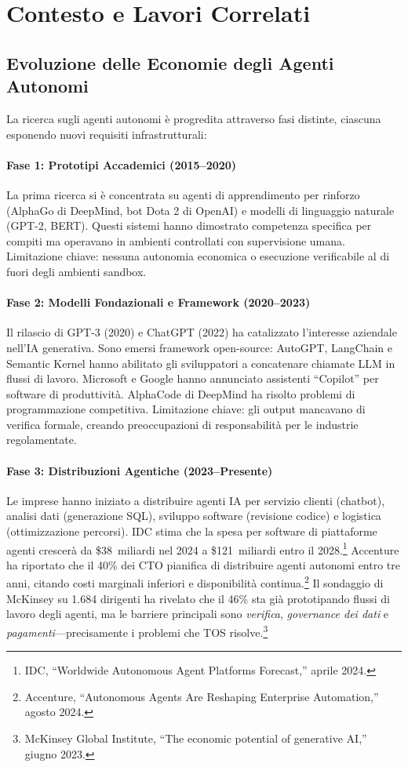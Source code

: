 \documentclass[11pt]{article}
\begin{document}
\section{Contesto e Lavori Correlati}
\subsection{Evoluzione delle Economie degli Agenti Autonomi}
La ricerca sugli agenti autonomi è progredita attraverso fasi distinte, ciascuna esponendo nuovi requisiti infrastrutturali:

\paragraph{Fase 1: Prototipi Accademici (2015--2020)} La prima ricerca si è concentrata su agenti di apprendimento per rinforzo (AlphaGo di DeepMind, bot Dota 2 di OpenAI) e modelli di linguaggio naturale (GPT-2, BERT). Questi sistemi hanno dimostrato competenza specifica per compiti ma operavano in ambienti controllati con supervisione umana. Limitazione chiave: nessuna autonomia economica o esecuzione verificabile al di fuori degli ambienti sandbox.

\paragraph{Fase 2: Modelli Fondazionali e Framework (2020--2023)} Il rilascio di GPT-3 (2020) e ChatGPT (2022) ha catalizzato l'interesse aziendale nell'IA generativa. Sono emersi framework open-source: AutoGPT, LangChain e Semantic Kernel hanno abilitato gli sviluppatori a concatenare chiamate LLM in flussi di lavoro. Microsoft e Google hanno annunciato assistenti ``Copilot'' per software di produttività. AlphaCode di DeepMind ha risolto problemi di programmazione competitiva. Limitazione chiave: gli output mancavano di verifica formale, creando preoccupazioni di responsabilità per le industrie regolamentate.

\paragraph{Fase 3: Distribuzioni Agentiche (2023--Presente)} Le imprese hanno iniziato a distribuire agenti IA per servizio clienti (chatbot), analisi dati (generazione SQL), sviluppo software (revisione codice) e logistica (ottimizzazione percorsi). IDC stima che la spesa per software di piattaforme agenti crescerà da \$38~miliardi nel 2024 a \$121~miliardi entro il 2028.\footnote{IDC, ``Worldwide Autonomous Agent Platforms Forecast,'' aprile 2024.} Accenture ha riportato che il 40\% dei CTO pianifica di distribuire agenti autonomi entro tre anni, citando costi marginali inferiori e disponibilità continua.\footnote{Accenture, ``Autonomous Agents Are Reshaping Enterprise Automation,'' agosto 2024.} Il sondaggio di McKinsey su 1.684 dirigenti ha rivelato che il 46\% sta già prototipando flussi di lavoro degli agenti, ma le barriere principali sono \emph{verifica}, \emph{governance dei dati} e \emph{pagamenti}---precisamente i problemi che TOS risolve.\footnote{McKinsey Global Institute, ``The economic potential of generative AI,'' giugno 2023.}
\end{document}
